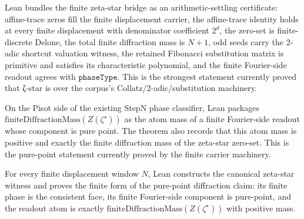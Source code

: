 \begin{theorem}
  \label{thm:zeta-star-arithmetic-settling-certificate}
  \leanok
  Lean bundles the finite zeta-star bridge as an arithmetic-settling
  certificate: affine-trace zeros fill the finite displacement carrier, the
  affine-trace identity holds at every finite displacement with denominator
  coefficient \(2^d\), the zero-set is finite-discrete Delone, the total finite
  diffraction mass is \(N+1\), odd seeds carry the 2-adic shortcut valuation
  witness, the retained Fibonacci substitution matrix is primitive and
  satisfies its characteristic polynomial, and the finite Fourier-side readout
  agrees with
  \(\texttt{phaseType}\).  This is the strongest statement currently proved that
  ζ-star is over the corpus's Collatz/2-adic/substitution machinery.
\end{theorem}

\begin{theorem}
  \label{thm:zeta-star-finite-mass-pure-point}
  \leanok
  On the Pisot side of the existing StepN phase classifier, Lean packages
  \(\mathrm{finiteDiffractionMass}(Z(\zeta^\star))\) as the atom mass of a
  finite Fourier-side readout whose component is pure point.  The theorem also
  records that this atom mass is positive and exactly the finite diffraction
  mass of the zeta-star zero-set.  This is the pure-point
  statement currently proved by the finite carrier machinery.
\end{theorem}

\begin{theorem}
  \label{thm:exists-zeta-star-finite-mass-pure-point}
  \leanok
  For every finite displacement window \(N\), Lean constructs the canonical
  zeta-star witness and proves the finite form of the pure-point diffraction
  claim: its finite phase is the consistent face, its finite Fourier-side
  component is pure-point, and the readout atom is exactly
  \(\mathrm{finiteDiffractionMass}(Z(\zeta^\star))\) with positive mass.
\end{theorem}


